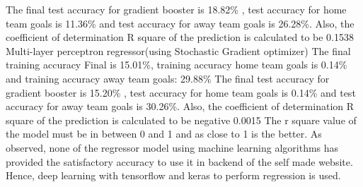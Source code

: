 The final test accuracy for gradient booster is 18.82\% , test accuracy for home team goals is 11.36\% and test accuracy for away team goals is 26.28\%. Also, the coefficient of determination R square of the prediction is calculated to be 0.1538 \newline
Multi-layer perceptron regressor(using Stochastic Gradient optimizer)\newline
The final training accuracy Final is 15.01\%, training accuracy home team goals is 0.14\% and training accuracy away team goals: 29.88\% \newline
The final test accuracy for gradient booster is 15.20\% , test accuracy for home team goals is 0.14\% and test accuracy for away team goals is 30.26\%. Also, the coefficient of determination R square of the prediction is calculated to be negative 0.0015 \newline 
The r square value of the model must be in between 0 and 1 and as close to 1 is the better.\newline
As observed, none of the regressor model using machine learning algorithms has provided the satisfactory accuracy to use it in backend of the self made website. Hence, deep learning with tensorflow and keras to perform regression is used.\newline
